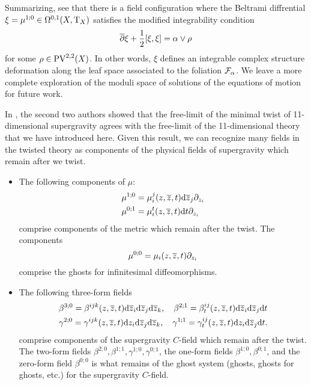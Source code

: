 Summarizing, see that there is a field configuration where the Beltrami diffrential $\xi = \mu^{1;0} \in \Omega^{0,1}(X, {\rm T}_X)$ satisfies the modified integrability condition
\[
\overline{\partial} \xi + \frac12  [\xi , \xi] = \alpha \vee \rho
\]
for some $\rho \in {\rm PV}^{2,2} (X)$. 
In other words, $\xi$ defines an integrable complex structure deformation along the leaf space associated to the foliation $\mathcal F_\alpha$. 
We leave a more complete exploration of the moduli space of solutions of the equations of motion for future work. 

In \cite{SWspinor}, the second two authors showed that the free-limit of the minimal twist of 11-dimensional supergravity agrees with the free-limit of the 11-dimensional theory that we have introduced here. 
Given this result, we can recognize many fields in the twisted theory as components of the physical fields of supergravity which remain after we twist. 

\begin{itemize}
\item 
The following components of $\mu$:
\begin{align*}
\mu^{1;0} & = \mu^j_i(z,\overline{z},t) {\rm d} \overline{z}_j \partial_{z_i} \\
\mu^{0;1} & = \mu^t_i (z,\overline{z},t) {\rm d} t \partial_{z_i}
\end{align*}
comprise components of the metric which remain after the twist. 
The components 
\[
\mu^{0;0} = \mu_i (z,\overline{z},t) \partial_{z_i} 
\]
comprise the ghosts for infinitesimal diffeomorphisms. 
\item 
The following three-form fields
\begin{multline}
\beta^{3;0} = \beta^{ijk} (z,\overline{z},t) {\rm d} \overline{z}_i {\rm d} \overline{z}_j {\rm d} \overline{z}_k , \quad \beta^{2;1} = \beta^{ij}_t (z,\overline{z},t) {\rm d} \overline{z}_i {\rm d} \overline{z}_j {\rm d} t \\
\gamma^{2;0} = \gamma^{ijk} (z,\overline{z},t) {\rm d} z_i {\rm d} \overline{z}_j {\rm d} \overline{z}_k , \quad \gamma^{1;1} = \gamma^{ij}_t (z,\overline{z},t) {\rm d} z_i {\rm d} \overline{z}_j {\rm d} t .
\end{multline} 
comprise components of the supergravity $C$-field which remain after the twist. 
The two-form fields $\beta^{2;0}, \beta^{1;1}, \gamma^{1;0}, \gamma^{0;1}$, the one-form fields $\beta^{1;0}, \beta^{0;1}$, and the zero-form field $\beta^{0;0}$ is what remains of the ghost system (ghosts, ghosts for ghosts, etc.) for the supergravity $C$-field. 
\end{itemize}

